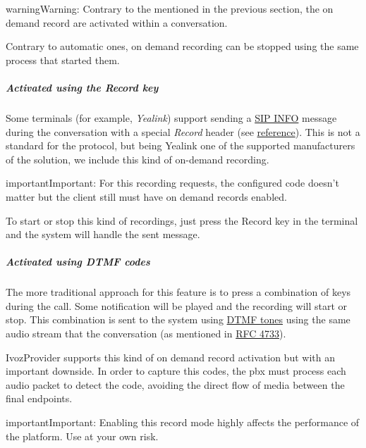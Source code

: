 \documentclass[letterpaper,10pt,english]{sphinxmanual}
\begin{document}
\begin{notice}{warning}{Warning:}
Contrary to the {\hyperref[administration_portal/platform/services:services]{}} mentioned in the
previous section, the on demand record are activated within a conversation.
\end{notice}

Contrary to automatic ones, on demand recording can be stopped using the same
process that started them.


\subparagraph{Activated using the \emph{Record} key}
\label{administration_portal/client/vpbx/calls/call_recordings:activated-using-the-record-key}
Some terminals (for example, \emph{Yealink}) support sending a \href{https://tools.ietf.org/html/rfc6086}{SIP INFO} message during the conversation with a
special \emph{Record} header (see \href{http://www.yealink.com/Upload/document/UsingCallRecordingFeatureonYealinkPhones/UsingCallRecordingFeatureonYealinkSIPT2XPphonesRev\_610-20561729764.pdf}{reference}).
This is not a standard for the protocol, but being Yealink one of the supported
manufacturers of the solution, we include this kind of on-demand recording.

\begin{notice}{important}{Important:}
For this recording requests, the configured code doesn't matter
but the client still must have on demand records enabled.
\end{notice}

To start or stop this kind of recordings, just press the Record key in the
terminal and the system will handle the sent message.


\subparagraph{Activated using \emph{DTMF} codes}
\label{administration_portal/client/vpbx/calls/call_recordings:activated-using-dtmf-codes}
The more traditional approach for this feature is to press a combination of
keys during the call. Some notification will be played and the recording will
start or stop. This combination is sent to the system using \href{https://es.wikipedia.org/wiki/Marcaci\%C3\%B3n\_por\_tonos}{DTMF tones} using the same audio
stream that the conversation (as mentioned in \href{https://tools.ietf.org/html/rfc4733}{RFC 4733}).

IvozProvider supports this kind of on demand record activation but with an
important downside. In order to capture this codes, the pbx must process each
audio packet to detect the code, avoiding the direct flow of media between the
final endpoints.

\begin{notice}{important}{Important:}
Enabling this record mode highly affects the performance of the
platform. Use at your own risk.
\end{notice}
\end{document}
